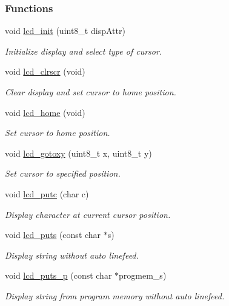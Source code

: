 \subsubsection*{Functions}
\begin{DoxyCompactItemize}
\item 
void \hyperlink{a00010_ga9af28b2779326b63ff4356e2b1828984}{lcd\+\_\+init} (uint8\+\_\+t disp\+Attr)
\begin{DoxyCompactList}\small\item\em Initialize display and select type of cursor. \end{DoxyCompactList}\item 
void \hyperlink{a00010_gaf8da853dba4b9d5f2aea4e294444e14d}{lcd\+\_\+clrscr} (void)
\begin{DoxyCompactList}\small\item\em Clear display and set cursor to home position. \end{DoxyCompactList}\item 
void \hyperlink{a00010_ga3aabf730aa4e0393bb5c959583c00a8e}{lcd\+\_\+home} (void)
\begin{DoxyCompactList}\small\item\em Set cursor to home position. \end{DoxyCompactList}\item 
void \hyperlink{a00010_gadbf47a5efdf02367ded1ebf8f9edb5fe}{lcd\+\_\+gotoxy} (uint8\+\_\+t x, uint8\+\_\+t y)
\begin{DoxyCompactList}\small\item\em Set cursor to specified position. \end{DoxyCompactList}\item 
void \hyperlink{a00010_gafa7e36b95c43d603f510273ad077cbbe}{lcd\+\_\+putc} (char c)
\begin{DoxyCompactList}\small\item\em Display character at current cursor position. \end{DoxyCompactList}\item 
void \hyperlink{a00010_ga8ffdfcac7638368ff04364c14984266e}{lcd\+\_\+puts} (const char $\ast$s)
\begin{DoxyCompactList}\small\item\em Display string without auto linefeed. \end{DoxyCompactList}\item 
void \hyperlink{a00010_ga9022a24a56a9b15681f62eb6ba77e5de}{lcd\+\_\+puts\+\_\+p} (const char $\ast$progmem\+\_\+s)
\begin{DoxyCompactList}\small\item\em Display string from program memory without auto linefeed. \end{DoxyCompactList}\item 

\end{DoxyCompactItemize}

